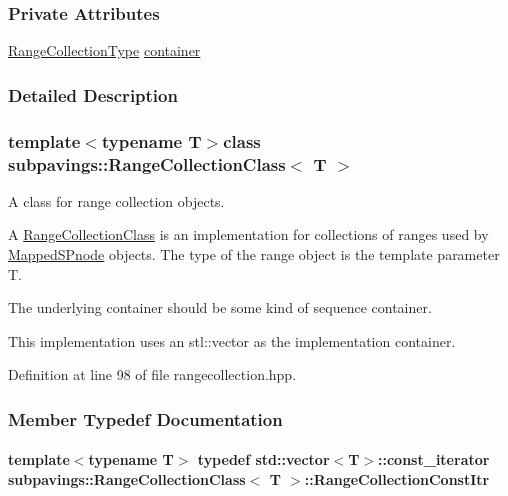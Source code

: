 \subsubsection*{\-Private \-Attributes}
\begin{DoxyCompactItemize}
\item 
\hyperlink{classsubpavings_1_1RangeCollectionClass_aad6b97397ee955fe4ed74e1d8dc0776a}{\-Range\-Collection\-Type} \hyperlink{classsubpavings_1_1RangeCollectionClass_a91c127974a65a450569f9c33bbc2fcf6}{container}
\end{DoxyCompactItemize}


\subsubsection{\-Detailed \-Description}
\subsubsection*{template$<$typename \-T$>$class subpavings\-::\-Range\-Collection\-Class$<$ T $>$}

\-A class for range collection objects. 

\-A \hyperlink{classsubpavings_1_1RangeCollectionClass}{\-Range\-Collection\-Class} is an implementation for collections of ranges used by \hyperlink{classsubpavings_1_1MappedSPnode}{\-Mapped\-S\-Pnode} objects. \-The type of the range object is the template parameter \-T.

\-The underlying container should be some kind of sequence container.

\-This implementation uses an stl\-::vector as the implementation container. 

\-Definition at line 98 of file rangecollection.\-hpp.



\subsubsection{\-Member \-Typedef \-Documentation}
\hypertarget{classsubpavings_1_1RangeCollectionClass_a636405dad973d70f8addd86d416418ca}{
\paragraph[{\-Range\-Collection\-Const\-Itr}]{\setlength{\rightskip}{0pt plus 5cm}template$<$typename \-T$>$ typedef std\-::vector$<$\-T$>$\-::const\-\_\-iterator {\bf subpavings\-::\-Range\-Collection\-Class}$<$ \-T $>$\-::{\bf \-Range\-Collection\-Const\-Itr}}}\label{classsubpavings_1_1RangeCollectionClass_a636405dad973d70f8addd86d416418ca}


